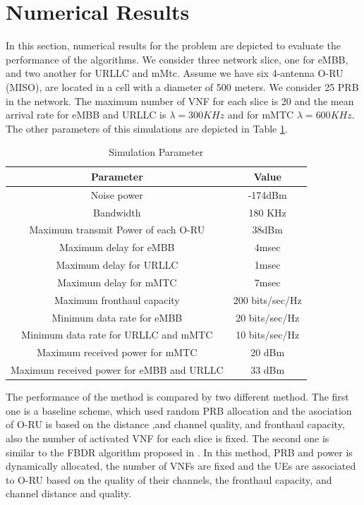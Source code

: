 \documentclass[conference]{IEEEtran}
\begin{document}
\section{Numerical Results}\label{NE}
In this section, numerical results for the problem are depicted to evaluate the performance of the algorithms. We consider three network slice, one for eMBB, and two another for URLLC and mMtc.
Assume we have six 4-antenna O-RU (MISO), are located in a cell with a diameter of 500 meters. We consider 25 PRB
in the network.
The maximum number of VNF for each slice is 20 and the mean arrival rate for eMBB and URLLC is $\lambda  = 300KHz$ and for mMTC $\lambda  = 600KHz$. 
The other parameters of this simulations are depicted in Table \ref{table:1a}.
\begin{table}
 \caption {Simulation Parameter} \label{table:1a}
 \begin{center}
  \begin{tabular}{||c c ||}
  \hline
Parameter & Value \\ [0.5ex]
  \hline\hline
  Noise power & -174dBm\\
  \hline
  Bandwidth & 180 KHz \\
  \hline
 Maximum transmit Power of each O-RU & 38dBm \\
  \hline
  Maximum delay for eMBB &  4msec \\
  \hline
    Maximum delay for URLLC &  1msec \\
  \hline
  Maximum delay for mMTC &  7msec \\
  \hline
  Maximum fronthaul capacity  & 200 bits/sec/Hz \\
   \hline
  Minimum data rate for eMBB &  20 bits/sec/Hz \\ 
  \hline
   Minimum data rate for URLLC and mMTC &  10 bits/sec/Hz \\ 
  \hline
   Maximum received power for mMTC &  20 dBm \\ [.5ex]   
  \hline
    Maximum received power for eMBB and URLLC &  33 dBm \\ [.5ex]   
  \hline
 \end{tabular}
 \end{center}
 \end{table}
 The performance of the method is compared by two different method. The first one is a baseline scheme, which used random PRB allocation and the asociation of O-RU is based on the distance ,and channel quality, and fronthaul capacity, also the number of activated VNF for each slice is fixed. The second one is similar to the FBDR algorithm proposed in \cite{lee2018dynamic}. In this method, PRB and power is dynamically allocated, the number of VNFs are fixed and the UEs are associated to O-RU based on the quality of their channels, the fronthaul capacity, and channel distance and quality.
\end{document}

